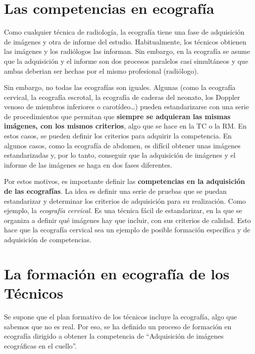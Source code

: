 \documentclass[]{article}
\begin{document}
\hypertarget{las-competencias-en-ecografia}{%
\section{Las competencias en ecografía}\label{las-competencias-en-ecografia}}

Como cualquier técnica de radiología, la ecografía tiene una fase de adquisición de imágenes y otra de informe del estudio. Habitualmente, los técnicos obtienen las imágenes y los radiólogos las informan. Sin embargo, en la ecografía se asume que la adquisición y el informe son dos procesos paralelos casi simultáneos y que ambas deberian ser hechas por el mismo profesional (radiólogo).

Sin embargo, no todas las ecografías son iguales. Algunas (como la ecografía cervical, la ecografía escrotal, la ecografía de caderas del neonato, los Doppler venoso de miembros inferiores o carotídeo\ldots{}) pueden estandarizarse con una serie de procedimientos que permitan que \textbf{siempre se adquieran las mismas imágenes, con los mismos criterios}, algo que se hace en la TC o la RM. En estos casos, se pueden definir los criterios para adquirir la competencia. En algunos casos, como la ecografía de abdomen, es difícil obtener unas imágenes estandarizadas y, por lo tanto, conseguir que la adquisición de imágenes y el informe de las imágenes se haga en dos fases diferentes.

Por estos motivos, es importante definir las \textbf{competencias en la adquisición de las ecografías}. La idea es definir una serie de pruebas que se puedan estandarizar y determinar los criterios de adquisición para su realización. Como ejemplo, la \emph{ecografía cervical}. Es una técnica fácil de estandarizar, en la que se organiza a definir qué imágenes hay que incluir, con sus criterios de calidad. Esto hace que la ecografía cervical sea un ejemplo de posible formación específica y de adquisición de competencias.

\hypertarget{la-formacion-en-ecografia-de-los-tecnicos}{%
\section{La formación en ecografía de los Técnicos}\label{la-formacion-en-ecografia-de-los-tecnicos}}

Se supone que el plan formativo de los técnicos incluye la ecografía, algo que sabemos que no es real. Por eso, se ha definido un proceso de formación en ecografía dirigido a obtener la competencia de ``Adquisición de imágenes ecográficas en el cuello''.
\end{document}
